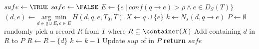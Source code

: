 \begin{algorithm2e}
\caption{$\SanitizeBuffer(T_0, T, B, H)$}
\label{algo:sanitize}
\begin{algorithmic}[1]
\STATE $safe \leftarrow \TRUE$
\label{algo:pick_rs}
    \STATE $safe \leftarrow \FALSE$
    \STATE $E \gets \{e ~|~ conf(q \rightarrow e) > \rho \land  e \in D_S(T)\}$
        \STATE $(d, e) \gets\underset{d\in q\cup E, e \in E}{\arg\min}\, H(d, q, e, T_0, T)$
        \label{algo:heur_dist}
    \STATE $X\leftarrow q\cup\{e\}$
    \STATE $k\leftarrow N_s(d,q \rightarrow e)$\label{line:sanitize-k}
    \STATE $P\leftarrow \emptyset$
    \label{line:sanitize-whilek}
        \STATE randomly pick a record $R$ from $T$ where
		$R\subseteq \container(X)$ \label{pick_row}
        \STATE Add \qids containing $d$ in $R$ to $P$
        \STATE $R\leftarrow R-\{d\}$\label{line:sanitize-suppress}
        \STATE $k \leftarrow k-1$
    \ENDWHILE
    \STATE Update $sup$ of \qids in $P$ \label{algo:update_kl}
\ENDWHILE \label{algo:pick_re}
\STATE \textbf{return} $safe$
\end{algorithmic}
\end{algorithm2e}

%
%

